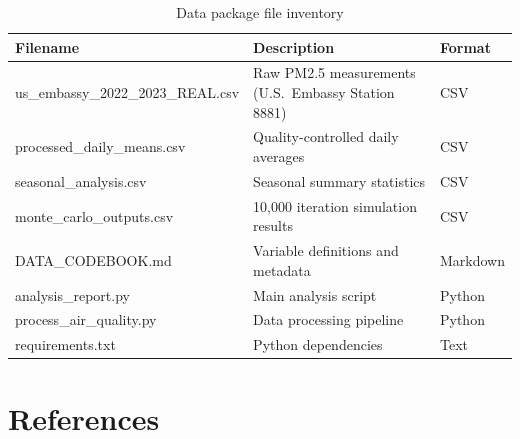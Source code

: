 \documentclass[11pt,a4paper]{article}
\begin{document}
\begin{table}[H]
\centering
\caption{Data package file inventory}
\begin{tabular}{lll}
\toprule
Filename & Description & Format \\
\midrule
us\_embassy\_2022\_2023\_REAL.csv & Raw PM2.5 measurements (U.S.\ Embassy Station 8881) & CSV \\
processed\_daily\_means.csv & Quality-controlled daily averages & CSV \\
seasonal\_analysis.csv & Seasonal summary statistics & CSV \\
monte\_carlo\_outputs.csv & 10,000 iteration simulation results & CSV \\
DATA\_CODEBOOK.md & Variable definitions and metadata & Markdown \\
analysis\_report.py & Main analysis script & Python \\
process\_air\_quality.py & Data processing pipeline & Python \\
requirements.txt & Python dependencies & Text \\
\bottomrule
\end{tabular}
\end{table}

\section{References}
\end{document}
